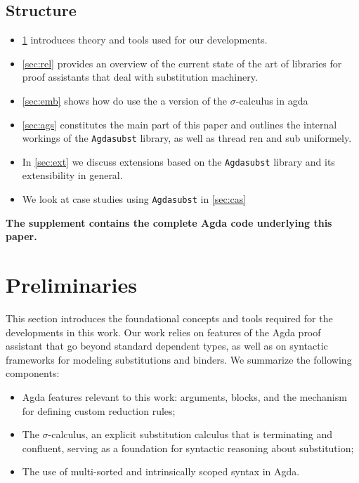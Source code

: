 \documentclass[screen,nonacm]{acmart}
\begin{document}
\subsection*{Structure}

\begin{itemize}
      \item \cref{sec:pre} introduces theory and tools used for our developments.

      \item \cref{sec:rel} provides an overview of the current state of the art of libraries for
            proof assistants that deal with substitution machinery.

      \item \cref{sec:emb} shows how do use the a version of the $\sigma$-calculus in agda

      \item \cref{sec:ags} constitutes the main part of this paper and outlines the internal
            workings of the \texttt{Agdasubst} library, as well as thread ren and sub uniformely.

      \item In \cref{sec:ext} we discuss extensions based on the \texttt{Agdasubst} library
            and its extensibility in general.

      \item We look at case studies using \texttt{Agdasubst} in \cref{sec:cas}
\end{itemize}

\textbf{The supplement contains the complete Agda code underlying this paper.}

\section{Preliminaries}\label{sec:pre}
This section introduces the foundational concepts and tools required for the
developments in this work. Our work relies on features of the Agda proof
assistant that go beyond standard dependent types, as well as on syntactic
frameworks for modeling substitutions and binders. We summarize the following
components:

\begin{itemize}
      \item Agda features relevant to this work:  arguments,
             blocks, and the  mechanism for
            defining custom reduction rules;
      \item The $\sigma$-calculus, an explicit substitution calculus that is terminating
            and confluent, serving as a foundation for syntactic reasoning about
            substitution;
      \item The use of multi-sorted and intrinsically scoped syntax in Agda.
\end{itemize}
\end{document}
